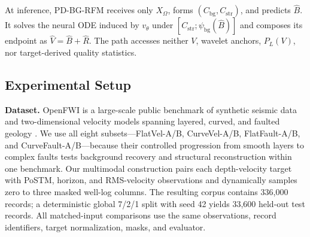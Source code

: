 At inference, PD-BG-RFM receives only $X_\Omega$, forms $(C_{\mathrm{bg}},C_{\mathrm{str}})$, and predicts $\hat B$. It solves the neural ODE \cite{chen2018neuralode} induced by $v_\theta$ under $[C_{\mathrm{str}};\psi_{\mathrm{bg}}(\hat B)]$ and composes its endpoint as $\hat V=\hat B+\hat R$. The path accesses neither $V$, wavelet anchors, $P_L(V)$, nor target-derived quality statistics.

\subsection{Experimental Setup}
\textbf{Dataset.} OpenFWI is a large-scale public benchmark of synthetic seismic data and two-dimensional velocity models spanning layered, curved, and faulted geology \cite{deng2022openfwi}. We use all eight subsets---FlatVel-A/B, CurveVel-A/B, FlatFault-A/B, and CurveFault-A/B---because their controlled progression from smooth layers to complex faults tests background recovery and structural reconstruction within one benchmark. Our multimodal construction pairs each depth-velocity target with PoSTM, horizon, and RMS-velocity observations and dynamically samples zero to three masked well-log columns. The resulting corpus contains 336,000 records; a deterministic global 7/2/1 split with seed 42 yields 33,600 held-out test records. All matched-input comparisons use the same observations, record identifiers, target normalization, masks, and evaluator.




